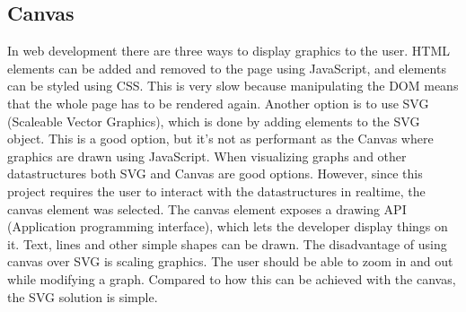\subsection{Canvas}
In web development there are three ways to display graphics to the user. HTML elements can be added and removed to the page using JavaScript, and elements can be styled using CSS. This is very slow because manipulating the DOM means that the whole page has to be rendered again. Another option is to use SVG (Scaleable Vector Graphics), which is done by adding elements to the SVG object. This is a good option, but it's not as performant as the Canvas where graphics are drawn using JavaScript. When visualizing graphs and other datastructures both SVG and Canvas are good options. However, since this project requires the user to interact with the datastructures in realtime, the canvas element was selected. The canvas element exposes a drawing API (Application programming interface), which lets the developer display things on it. Text, lines and other simple shapes can be drawn. The disadvantage of using canvas over SVG is scaling graphics. The user should be able to zoom in and out while modifying a graph. Compared to how this can be achieved with the canvas, the SVG solution is simple.